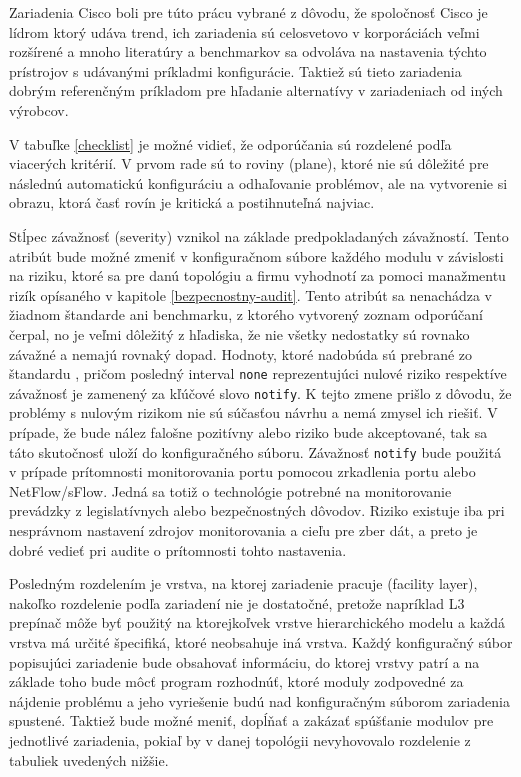 Zariadenia Cisco boli pre túto prácu vybrané z dôvodu, že spoločnosť Cisco je lídrom ktorý udáva trend, ich zariadenia sú celosvetovo v korporáciách veľmi rozšírené a mnoho literatúry a benchmarkov sa odvoláva na nastavenia týchto prístrojov s udávanými príkladmi konfigurácie. Taktiež sú tieto zariadenia dobrým referenčným príkladom pre hľadanie alternatívy v zariadeniach od iných výrobcov.

V tabuľke \ref{checklist} je možné vidieť, že odporúčania sú rozdelené podľa viacerých kritérií. V prvom rade sú to roviny (plane), ktoré nie sú dôležité pre následnú automatickú konfiguráciu a odhaľovanie problémov, ale na vytvorenie si obrazu, ktorá časť rovín je kritická a postihnuteľná najviac. 

Stĺpec závažnosť (severity) vznikol na základe predpokladaných závažností. Tento atribút bude možné zmeniť v konfiguračnom súbore každého modulu v závislosti na riziku, ktoré sa pre danú topológiu a firmu vyhodnotí za pomoci manažmentu rizík opísaného v kapitole \ref{bezpecnostny-audit}. Tento atribút sa nenachádza v žiadnom štandarde ani benchmarku, z ktorého vytvorený zoznam odporúčaní čerpal, no je veľmi dôležitý z hľadiska, že nie všetky nedostatky sú rovnako závažné a nemajú rovnaký dopad. Hodnoty, ktoré nadobúda sú prebrané zo štandardu , pričom posledný interval \texttt{none} reprezentujúci nulové riziko respektíve závažnosť je zamenený za kľúčové slovo \texttt{notify}. K tejto zmene prišlo z dôvodu, že problémy s nulovým rizikom nie sú súčasťou návrhu a nemá zmysel ich riešiť. V prípade, že bude nález falošne pozitívny alebo riziko bude akceptované, tak sa táto skutočnosť uloží do konfiguračného súboru. Závažnosť \texttt{notify} bude použitá v prípade prítomnosti monitorovania portu pomocou zrkadlenia portu alebo NetFlow/sFlow. Jedná sa totiž o technológie potrebné na monitorovanie prevádzky z legislatívnych alebo bezpečnostných dôvodov. Riziko existuje iba pri nesprávnom nastavení zdrojov monitorovania a cieľu pre zber dát, a preto je dobré vedieť pri audite o prítomnosti tohto nastavenia.
 

Posledným rozdelením je vrstva, na ktorej zariadenie pracuje (facility layer), nakoľko rozdelenie podľa zariadení nie je dostatočné, pretože napríklad L3 prepínač môže byť použitý na ktorejkoľvek vrstve hierarchického modelu a každá vrstva má určité špecifiká, ktoré neobsahuje iná vrstva. Každý konfiguračný súbor popisujúci zariadenie bude obsahovať informáciu, do ktorej vrstvy patrí a na základe toho bude môcť program rozhodnúť, ktoré moduly zodpovedné za nájdenie problému a jeho vyriešenie budú nad konfiguračným súborom zariadenia spustené. Taktiež bude možné meniť, dopĺňať a zakázať spúšťanie modulov pre jednotlivé zariadenia, pokiaľ by v danej topológii nevyhovovalo rozdelenie z tabuliek uvedených nižšie. 


